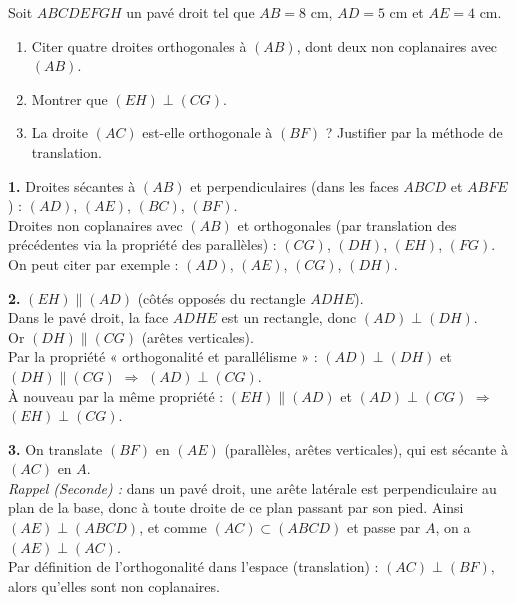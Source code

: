 \documentclass[11pt]{article}
\begin{document}
\begin{exercice}
Soit $ABCDEFGH$ un pavé droit tel que $AB = 8$ cm, $AD = 5$ cm et $AE = 4$ cm.
\begin{enumerate}
\item Citer quatre droites orthogonales à $(AB)$, dont deux non coplanaires avec $(AB)$.
\item Montrer que $(EH) \perp (CG)$.
\item La droite $(AC)$ est-elle orthogonale à $(BF)$ ? Justifier par la méthode de translation.
\end{enumerate}
\end{exercice}

\begin{corrige}
\textbf{1.} Droites sécantes à $(AB)$ et perpendiculaires (dans les faces $ABCD$ et $ABFE$) : $(AD)$, $(AE)$, $(BC)$, $(BF)$. \\
Droites non coplanaires avec $(AB)$ et orthogonales (par translation des précédentes via la propriété des parallèles) : $(CG)$, $(DH)$, $(EH)$, $(FG)$. \\
On peut citer par exemple : $(AD)$, $(AE)$, $(CG)$, $(DH)$.

\textbf{2.} $(EH) \parallel (AD)$ (côtés opposés du rectangle $ADHE$). \\
Dans le pavé droit, la face $ADHE$ est un rectangle, donc $(AD) \perp (DH)$. \\
Or $(DH) \parallel (CG)$ (arêtes verticales). \\
Par la propriété « orthogonalité et parallélisme » : $(AD) \perp (DH)$ et $(DH) \parallel (CG)$ $\Rightarrow$ $(AD) \perp (CG)$. \\
À nouveau par la même propriété : $(EH) \parallel (AD)$ et $(AD) \perp (CG)$ $\Rightarrow$ $\boxed{(EH) \perp (CG)}$.

\textbf{3.} On translate $(BF)$ en $(AE)$ (parallèles, arêtes verticales), qui est sécante à $(AC)$ en $A$. \\
\textit{Rappel (Seconde) :} dans un pavé droit, une arête latérale est perpendiculaire au plan de la base, donc à toute droite de ce plan passant par son pied. Ainsi $(AE) \perp (ABCD)$, et comme $(AC) \subset (ABCD)$ et passe par $A$, on a $(AE) \perp (AC)$. \\
Par définition de l'orthogonalité dans l'espace (translation) : $\boxed{(AC) \perp (BF)}$, alors qu'elles sont non coplanaires.
\end{corrige}
\end{document}

